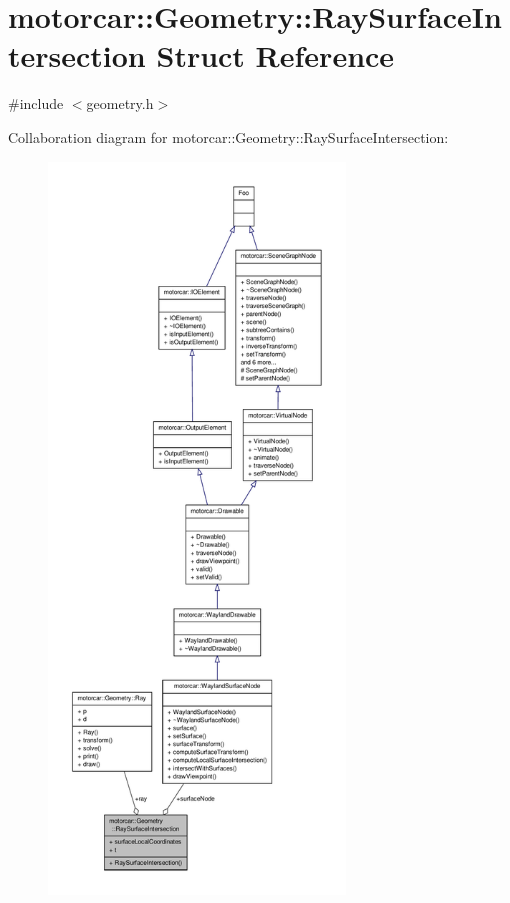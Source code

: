 \hypertarget{structmotorcar_1_1Geometry_1_1RaySurfaceIntersection}{\section{motorcar\-:\-:Geometry\-:\-:Ray\-Surface\-Intersection Struct Reference}
\label{structmotorcar_1_1Geometry_1_1RaySurfaceIntersection}
}


{\ttfamily \#include $<$geometry.\-h$>$}



Collaboration diagram for motorcar\-:\-:Geometry\-:\-:Ray\-Surface\-Intersection\-:
\nopagebreak
\begin{figure}[H]
\begin{center}
\leavevmode
\includegraphics[height=550pt]{structmotorcar_1_1Geometry_1_1RaySurfaceIntersection__coll__graph}
\end{center}
\end{figure}
